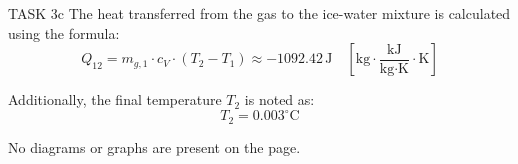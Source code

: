 TASK 3c  
The heat transferred from the gas to the ice-water mixture is calculated using the formula:  
\[
Q_{12} = m_{g,1} \cdot c_V \cdot (T_2 - T_1) \approx -1092.42 \, \text{J} \quad \left[ \text{kg} \cdot \frac{\text{kJ}}{\text{kg} \cdot \text{K}} \cdot \text{K} \right]
\]  

Additionally, the final temperature \( T_2 \) is noted as:  
\[
T_2 = 0.003^\circ \text{C}
\]  

No diagrams or graphs are present on the page.